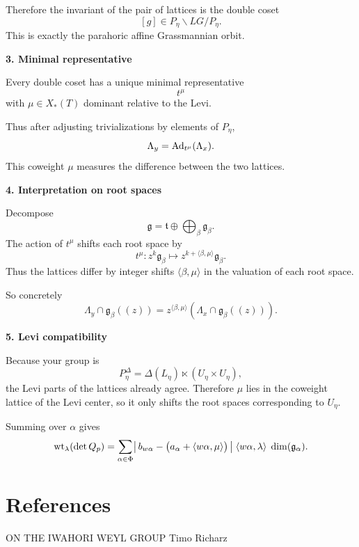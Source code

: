 \documentclass[12pt]{article}
\begin{document}
Therefore the invariant of the pair of lattices is the double coset
\[
[g] \in P_\eta \backslash LG / P_\eta.
\]
This is exactly the parahoric affine Grassmannian orbit.

\medskip\noindent\textbf{3. Minimal representative}

Every double coset has a unique minimal representative
\[
t^\mu
\]
with $\mu\in X_*(T)$ dominant relative to the Levi.

Thus after adjusting trivializations by elements of $P_\eta$,
\[
\Lambda_y = \operatorname{Ad}_{t^\mu}(\Lambda_x).
\]
This coweight $\mu$ measures the difference between the two lattices.

\medskip\noindent\textbf{4. Interpretation on root spaces}

Decompose
\[
\mathfrak{g}=\mathfrak{t}\oplus\bigoplus_{\beta}\mathfrak{g}_\beta.
\]
The action of $t^\mu$ shifts each root space by
\[
t^\mu : z^k\mathfrak{g}_\beta \mapsto z^{k+\langle\beta,\mu\rangle}\mathfrak{g}_\beta.
\]
Thus the lattices differ by integer shifts $\langle\beta,\mu\rangle$ in the valuation of each root space.

So concretely
\[
\Lambda_y \cap \mathfrak{g}_\beta((z))
=
z^{\langle\beta,\mu\rangle}
(\Lambda_x \cap \mathfrak{g}_\beta((z))).
\]

\medskip\noindent\textbf{5. Levi compatibility}

Because your group is
\[
P_\eta^\Delta=\Delta(L_\eta)\ltimes(U_\eta\times U_\eta),
\]
the Levi parts of the lattices already agree. Therefore $\mu$ lies in the coweight lattice of the Levi center, so it only shifts the root spaces corresponding to $U_\eta$.

Summing over $\alpha$ gives
\[
\operatorname{wt}_\lambda(\det Q_p)
=
\sum_{\alpha\in\Phi}
\bigl|\,b_{w\alpha}-\bigl(a_\alpha+\langle w\alpha,\mu\rangle\bigr)\,\bigr|
\;\langle w\alpha,\lambda\rangle\;\dim(\mathfrak g_\alpha).
\]


\section{References}
ON THE IWAHORI WEYL GROUP Timo Richarz
\end{document}
